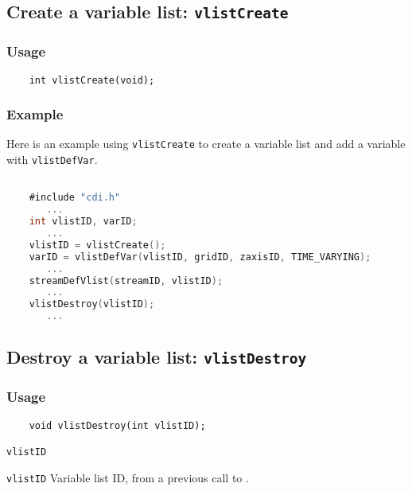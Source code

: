 

\subsection{Create a variable list: \texttt{vlistCreate}}
\label{vlistCreate}
\subsubsection*{Usage}

\begin{verbatim}
    int vlistCreate(void);
\end{verbatim}

\subsubsection*{Example}

Here is an example using {\texttt{vlistCreate}} to create a variable list
and add a variable with {\texttt{vlistDefVar}}.

\begin{lstlisting}[language=C, backgroundcolor=\color{pyellow}, basicstyle=\small, columns=flexible]

    #include "cdi.h"
       ...
    int vlistID, varID;
       ...
    vlistID = vlistCreate();
    varID = vlistDefVar(vlistID, gridID, zaxisID, TIME_VARYING);
       ...
    streamDefVlist(streamID, vlistID);
       ...
    vlistDestroy(vlistID);
       ...
\end{lstlisting}


\subsection{Destroy a variable list: \texttt{vlistDestroy}}
\label{vlistDestroy}
\subsubsection*{Usage}

\begin{verbatim}
    void vlistDestroy(int vlistID);
\end{verbatim}

\hspace*{4mm}\begin{minipage}[]{15cm}
\begin{deflist}{\texttt{vlistID}\ }
\item[\texttt{vlistID}]
Variable list ID, from a previous call to {}.

\end{deflist}
\end{minipage}


